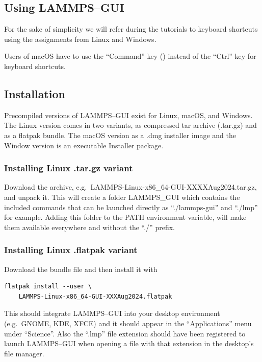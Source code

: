 \documentclass[9pt,tutorial]{livecoms}
\begin{document}
\begin{appendices}
\section{Using LAMMPS--GUI}
\label{using-lammps-gui-label}

\begin{note}
  For the sake of simplicity we will refer during the tutorials to
  keyboard shortcuts using the assignments from Linux and Windows.

  Users of macOS have to use the ``Command'' key (\cmd) instead of the
  ``Ctrl'' key for keyboard shortcuts.
\end{note}

\subsection{Installation}

Precompiled versions of LAMMPS--GUI exist for Linux, {macOS}, and
Windows.  The Linux version comes in two variants, as compressed tar
archive (.tar.gz) and as a flatpak \cite{flatpak_home} bundle. The macOS
version as a .dmg installer image and the Window version is an
executable Installer package.

\subsubsection{Installing Linux .tar.gz variant}

Download the archive, e.g.~LAMMPS-Linux-x86\_64-GUI-XXXXAug2024.tar.gz,
and unpack it.  This will create a folder LAMMPS\_GUI which contains the
included commands that can be launched directly as ``./lammps-gui'' and
``./lmp'' for example.  Adding this folder to the PATH environment
variable, will make them available everywhere and without the ``./''
prefix.

\subsubsection{Installing Linux .flatpak variant}

Download the bundle file and then install it with
{
\normalsize
\begin{verbatim}
flatpak install --user \
    LAMMPS-Linux-x86_64-GUI-XXXAug2024.flatpak
\end{verbatim}
}
This should integrate LAMMPS--GUI into your desktop environment
(e.g.~GNOME, KDE, XFCE) and it should appear in the ``Applications''
menu under ``Science''.  Also the ``.lmp'' file extension should have
been registered to launch LAMMPS--GUI when opening a file with that
extension in the desktop's file manager.


\end{appendices}
\end{document}
